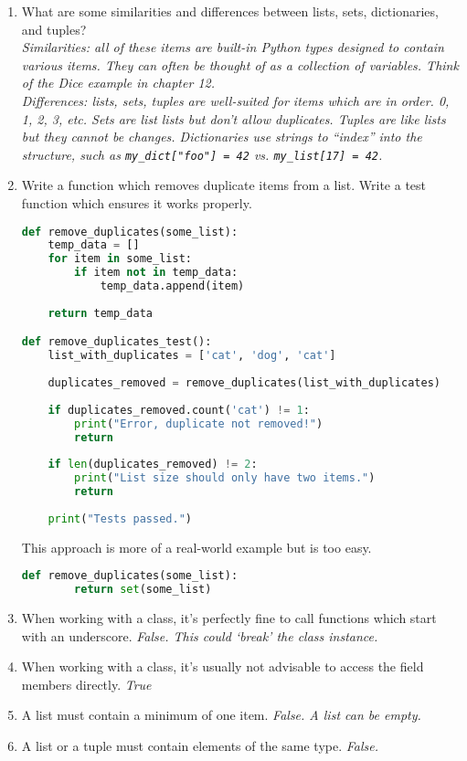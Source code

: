 \documentclass[letter,10pt]{article}
\begin{document}
\begin{enumerate}
    \item What are some similarities and differences between lists, sets, dictionaries, and tuples? \\
    \textit{Similarities: all of these items are built-in Python types designed to contain various items. They can often be thought of as a collection of variables. Think of the Dice example in chapter 12.} \\
    \textit{Differences: lists, sets, tuples are well-suited for items which are in order. 0, 1, 2, 3, etc. Sets are list lists but don't allow duplicates. Tuples are like lists but they cannot be changes. Dictionaries use strings to ``index'' into the structure, such as \texttt{my\_dict["foo"] = 42} vs. \texttt{my\_list[17] = 42}.}
    
    \item Write a function which removes duplicate items from a list. Write a test function which ensures it works properly.
    \begin{lstlisting}[language=python]
def remove_duplicates(some_list):
    temp_data = []
    for item in some_list:
        if item not in temp_data:
            temp_data.append(item)
    
    return temp_data

def remove_duplicates_test():
    list_with_duplicates = ['cat', 'dog', 'cat']
    
    duplicates_removed = remove_duplicates(list_with_duplicates)
    
    if duplicates_removed.count('cat') != 1:
        print("Error, duplicate not removed!")
        return
    
    if len(duplicates_removed) != 2:
        print("List size should only have two items.")
        return
    
    print("Tests passed.")
    \end{lstlisting}
    
    This approach is more of a real-world example but is too easy.
    \begin{lstlisting}[language=python]
    def remove_duplicates(some_list):
        return set(some_list)
    \end{lstlisting}
    
    \item When working with a class, it's perfectly fine to call functions which start with an underscore. \textit{False. This could `break' the class instance.}
    
    \item When working with a class, it's usually not advisable to access the field members directly. \textit{True}
    
    \item A list must contain a minimum of one item. \textit{False. A list can be empty.}
    
    \item A list or a tuple must contain elements of the same type. \textit{False.}
    
\end{enumerate}
\end{document}
